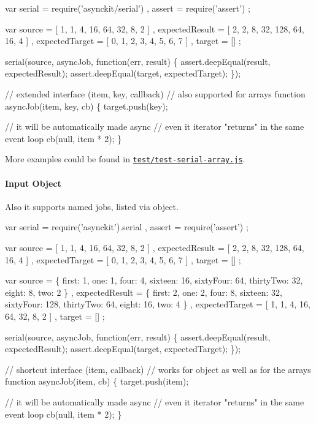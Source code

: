 \begin{DoxyCode}
var serial = require('asynckit/serial')
  , assert = require('assert')
  ;

var source         = [ 1, 1, 4, 16, 64, 32, 8, 2 ]
  , expectedResult = [ 2, 2, 8, 32, 128, 64, 16, 4 ]
  , expectedTarget = [ 0, 1, 2, 3, 4, 5, 6, 7 ]
  , target         = []
  ;

serial(source, asyncJob, function(err, result)
\{
  assert.deepEqual(result, expectedResult);
  assert.deepEqual(target, expectedTarget);
\});

// extended interface (item, key, callback)
// also supported for arrays
function asyncJob(item, key, cb)
\{
  target.push(key);

  // it will be automatically made async
  // even it iterator "returns" in the same event loop
  cb(null, item * 2);
\}
\end{DoxyCode}


More examples could be found in \href{test/test-serial-array.js}{\tt test/test-\/serial-\/array.\+js}.

\paragraph*{Input Object}

Also it supports named jobs, listed via object.


\begin{DoxyCode}
var serial = require('asynckit').serial
  , assert = require('assert')
  ;

var source         = [ 1, 1, 4, 16, 64, 32, 8, 2 ]
  , expectedResult = [ 2, 2, 8, 32, 128, 64, 16, 4 ]
  , expectedTarget = [ 0, 1, 2, 3, 4, 5, 6, 7 ]
  , target         = []
  ;

var source         = \{ first: 1, one: 1, four: 4, sixteen: 16, sixtyFour: 64, thirtyTwo: 32, eight: 8, two:
       2 \}
  , expectedResult = \{ first: 2, one: 2, four: 8, sixteen: 32, sixtyFour: 128, thirtyTwo: 64, eight: 16,
       two: 4 \}
  , expectedTarget = [ 1, 1, 4, 16, 64, 32, 8, 2 ]
  , target         = []
  ;


serial(source, asyncJob, function(err, result)
\{
  assert.deepEqual(result, expectedResult);
  assert.deepEqual(target, expectedTarget);
\});

// shortcut interface (item, callback)
// works for object as well as for the arrays
function asyncJob(item, cb)
\{
  target.push(item);

  // it will be automatically made async
  // even it iterator "returns" in the same event loop
  cb(null, item * 2);
\}
\end{DoxyCode}


